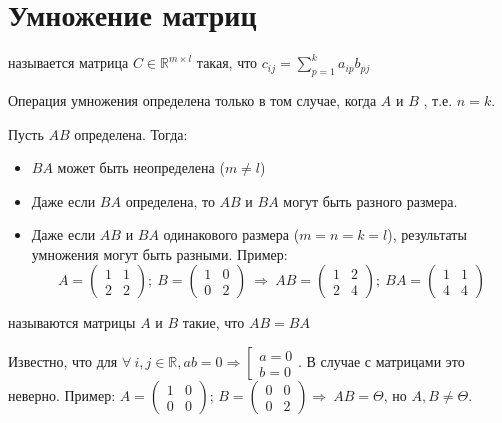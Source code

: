\section{Умножение матриц}
\begin{opred}
 называется матрица $C\in{}\mathbb{R}^{m\times{}l}$ такая, что $c_{ij}=\sum\limits^k_{p=1}a_{ip}b_{pj}$
\end{opred}
\begin{remark}
Операция умножения определена только в том случае, когда $A$ и $B$ , т.е. $n=k$.
\end{remark}
Пусть $AB$ определена. Тогда:\begin{itemize}
\item $BA$ может быть неопределена ($m\neq{}l$)
\item Даже если $BA$ определена, то $AB$ и $BA$ могут быть разного размера.
\item Даже если $AB$ и $BA$ одинакового размера ($m=n=k=l$), результаты умножения могут быть разными. Пример:
$$
A=\begin{pmatrix}
1 & 1 \\
2 & 2
\end{pmatrix};\ B=\begin{pmatrix}
1 & 0 \\
0 & 2
\end{pmatrix}\ \Rightarrow\ AB=\begin{pmatrix}
1 & 2 \\
2 & 4
\end{pmatrix};\ BA=\begin{pmatrix}
1 & 1 \\
4 & 4
\end{pmatrix}
$$
\end{itemize}
\begin{opred}
 называются матрицы $A$ и $B$ такие, что $AB=BA$
\end{opred}
Известно, что для $\forall\ i,j\in\mathbb{R}, ab=0 \Rightarrow \left[ \begin{aligned} 
a=0 \\
b=0
\end{aligned} \right.$. В случае с матрицами это неверно. Пример:
$
A=\begin{pmatrix}
1 & 0 \\
0 & 0
\end{pmatrix}$; $B=\begin{pmatrix}
0 & 0 \\
0 & 2
\end{pmatrix} \Rightarrow\ AB=\Theta$, но $A,B\neq\Theta$.
